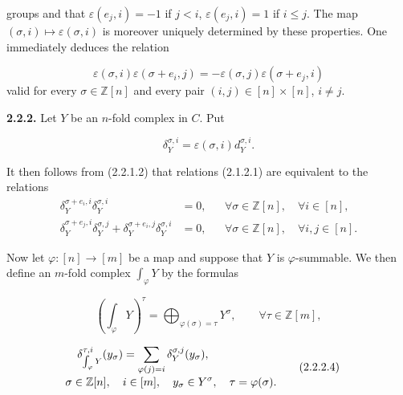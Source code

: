 %
%
groups and that $\varepsilon(e_j,i)=-1$ if $j<i$,
$\varepsilon(e_j,i)=1$ if $i\leq j$. The map
$(\sigma,i)\longmapsto\varepsilon(\sigma,i)$ is moreover uniquely
determined by these properties. One immediately deduces the relation

\begin{equation}
  \varepsilon(\sigma,i)\varepsilon(\sigma+e_i,j)
  =-\varepsilon(\sigma,j)\varepsilon(\sigma+e_j,i)
  \tag{2.2.1.2}
\end{equation}
valid for every $\sigma\in\mathbb Z[n]$ and every pair
$(i,j)\in[n]\times[n]$, $i\neq j$.

\noindent\textbf{2.2.2.}\quad
Let $Y$ be an $n$-fold complex in $C$. Put

\begin{equation}
  \delta_Y^{\sigma,i}=\varepsilon(\sigma,i)d_Y^{\sigma,i}.
  \tag{2.2.2.1}
\end{equation}

It then follows from (2.2.1.2) that relations (2.1.2.1) are equivalent to
the relations
\begin{equation}
  \begin{aligned}
    \delta_Y^{\sigma+e_i,i}\delta_Y^{\sigma,i}
      &=0,
      &&\forall\sigma\in\mathbb Z[n],\quad\forall i\in[n],\\
    \delta_Y^{\sigma+e_j,i}\delta_Y^{\sigma,j}
      +\delta_Y^{\sigma+e_i,j}\delta_Y^{\sigma,i}
      &=0,
      &&\forall\sigma\in\mathbb Z[n],\quad\forall i,j\in[n].
  \end{aligned}
  \tag{2.2.2.2}
\end{equation}

Now let $\varphi\colon[n]\longrightarrow[m]$ be a map and suppose that
$Y$ is $\varphi$-summable. We then define an $m$-fold complex
$\int_\varphi Y$ by the formulas

\begin{equation}
  \left(\int_\varphi Y\right)^\tau
  =\bigoplus_{\varphi(\sigma)=\tau}Y^\sigma,
  \qquad \forall\tau\in\mathbb Z[m],
  \tag{2.2.2.3}
\end{equation}

\begin{equation}
  \begin{aligned}
    \delta_{\int_\varphi Y}^{\tau,i}(y_\sigma)
      &=\sum_{\varphi(j)=i}\delta_Y^{\sigma,j}(y_\sigma),\\[-1mm]
    &\hspace{-18mm}
      \sigma\in\mathbb Z[n],\quad i\in[m],\quad
      y_\sigma\in Y^\sigma,\quad\tau=\varphi(\sigma).
  \end{aligned}
  \tag{2.2.2.4}
\end{equation}

